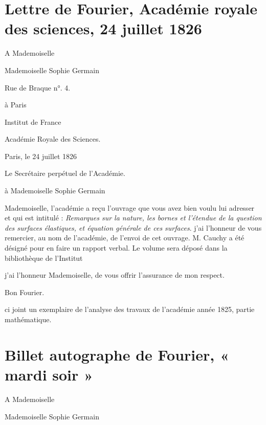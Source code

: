\documentclass[11pt,a4paper]{article}
\begin{document}
\section{Lettre de Fourier, Académie royale des sciences, 24 juillet 1826}

A Mademoiselle

Mademoiselle Sophie Germain

Rue de Braque n°. 4.

à Paris


Institut de France

Académie Royale des Sciences.

Paris, le 24 juillet 1826

Le Secrétaire perpétuel de l'Académie.


à Mademoiselle Sophie Germain

Mademoiselle, l'académie a reçu l'ouvrage que vous avez bien voulu lui
adresser et qui est intitulé : \emph{Remarques sur la nature, les bornes et
l'étendue de la question des surfaces élastiques, et équation générale de ces
surfaces}. j'ai l'honneur de vous remercier, au nom de l'académie, de l'envoi
de cet ouvrage. M. Cauchy a été désigné pour en faire un rapport verbal. Le
volume sera déposé dans la bibliothèque de l'Institut


j'ai l'honneur Mademoiselle, de vous offrir l'assurance de mon respect.

Bon Fourier.

ci joint un exemplaire de l'analyse des travaux de l'académie année 1825,
partie mathématique.


\section{Billet autographe de Fourier, « mardi soir »}

A Mademoiselle

Mademoiselle Sophie Germain

\end{document}
